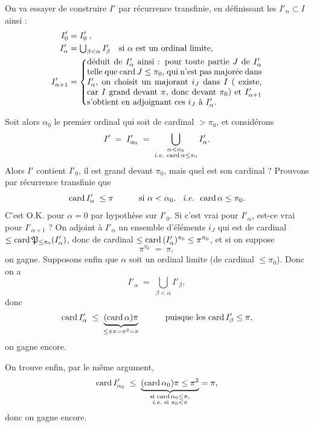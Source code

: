 On va essayer de construire $I'$ par récurrence transfinie, en définissant les $I'_\alpha\subset I$ ainsi :
\[
\begin{aligned}
I'_0 &= I'_0\;, \\
I'_\alpha &= \textstyle\bigcup_{\beta<\alpha} I'_\beta \quad \text{si $\alpha$ est un ordinal limite,} \\
I'_{\alpha+1} &= \left\{\parbox{0.6\textwidth}{déduit de $I'_\alpha$ ainsi : pour toute partie $J$ de $I'_\alpha$ telle que $\card J\le\pi_0$, qui n'est pas majorée dans $I'_\alpha$, on choisit un majorant $i_J$ dans $I$ ( existe, car $I$ grand devant $\pi$, donc devant $\pi_0$) et $I'_{\alpha+1}$ s'obtient en adjoignant ces $i_J$ à $I'_\alpha$.}\right.
\end{aligned}
\]

Soit alors $\alpha_0$ le premier ordinal qui soit de cardinal $>\pi_0$, et considérons
\[
I' \;=\; I'_{\alpha_0} \;=\; \bigcup\limits_{\substack{\alpha<\alpha_0\\ \textit{i.e.}\ \card\alpha\le\pi_0}} I'_\alpha .
\]
Alors $I'$ contient $I'_0$, il est grand devant $\pi_0$, mais quel est son cardinal ? Prouvons par récurrence transfinie que
\[
\mathrm{card}\, I'_\alpha \;\le\pi \qquad\quad \text{si } \alpha<\alpha_0,\ \ \textit{i.e.}\ \ \mathrm{card}\,\alpha\le\pi_0 .
\]
C'est O.K. pour $\alpha=0$ par hypothèse sur $I'_0$. Si c'est vrai pour $I'_\alpha$, est-ce vrai pour $I'_{\alpha+1}$ ? On adjoint à $I'_\alpha$ un ensemble d'éléments $i_J$ qui est de cardinal $\le\mathrm{card}\,\mathfrak{P}_{\le\pi_0}(I'_\alpha)$, donc de cardinal $\le\mathrm{card}\,(I'_\alpha)^{\pi_0}\le\pi^{\pi_0}$, et si on suppose
\[
\pi^{\pi_0} \;=\; \pi,
\]
on gagne. Supposons enfin que $\alpha$ soit un ordinal limite (de cardinal $\le\pi_0$). Donc on a
\[
I'_\alpha \;=\; \bigcup_{\beta<\alpha} I'_\beta ,
\]
donc
\[
\mathrm{card}\, I'_\alpha \;\le\; \underbrace{(\mathrm{card}\,\alpha)\pi}_{\le\pi\pi=\pi^2=\pi} \qquad\quad \text{puisque les } \mathrm{card}\, I'_\beta\le\pi,
\]
on gagne encore.

On trouve enfin, par le même argument,
\[
\mathrm{card}\, I'_{\alpha_0} \;\le\; \underbrace{(\mathrm{card}\,\alpha_0)\pi\le\pi^2}_{\substack{\text{si }\mathrm{card}\,\alpha_0\le\pi,\\ \textit{i.e.}\text{ si }\pi_0<\pi}} = \pi,
\]
donc on gagne encore.

